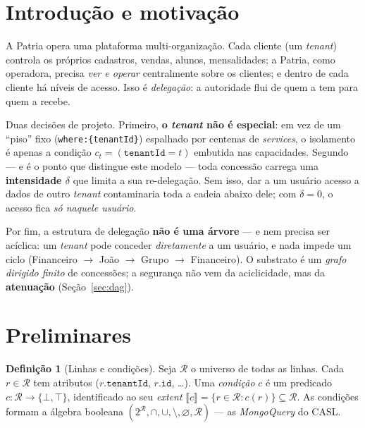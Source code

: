 \documentclass[11pt,a4paper]{article}
\theoremstyle{definition}
\newtheorem{definition}[theorem]{Definição}
\newcommand{\R}{\mathcal{R}}
\newcommand{\ext}[1]{\llbracket #1 \rrbracket}
\newcommand{\tenant}{\texttt{tenantId}}
\newcommand{\dep}{\delta}
\begin{document}
  \tableofcontents
  \bigskip

  \section{Introdução e motivação}

  A Patria opera uma plataforma multi-organização. Cada cliente (um
  \emph{tenant}) controla os próprios cadastros, vendas, alunos, mensalidades;
  a Patria, como operadora, precisa \emph{ver e operar} centralmente sobre os
  clientes; e dentro de cada cliente há níveis de acesso. Isso é
  \emph{delegação}: a autoridade flui de quem a tem para quem a recebe.

  Duas decisões de projeto. Primeiro, \textbf{o \emph{tenant} não é especial}:
  em vez de um ``piso'' fixo (\texttt{where:\{tenantId\}}) espalhado por
  centenas de \emph{services}, o isolamento é apenas a condição
  $c_t=(\tenant=t)$ embutida nas capacidades. Segundo --- e é o ponto que
  distingue este modelo --- toda concessão carrega uma \textbf{intensidade
  $\dep$} que limita a sua re-delegação. Sem isso, dar a um usuário acesso a
  dados de outro \emph{tenant} contaminaria toda a cadeia abaixo dele; com
  $\dep=0$, o acesso fica \emph{só naquele usuário}.

  Por fim, a estrutura de delegação \textbf{não é uma árvore} --- e nem precisa
  ser acíclica: um \emph{tenant} pode conceder \emph{diretamente} a um usuário,
  e nada impede um ciclo (Financeiro $\to$ João $\to$ Grupo $\to$ Financeiro).
  O substrato é um \emph{grafo dirigido finito} de concessões; a segurança não
  vem da aciclicidade, mas da \textbf{atenuação} (Seção~\ref{sec:dag}).

  \section{Preliminares}

  \begin{definition}[Linhas e condições]
  Seja $\R$ o universo de todas as linhas. Cada $r\in\R$ tem atributos
  ($r.\tenant$, $r.\texttt{id}$, \dots). Uma \emph{condição} $c$ é um predicado
  $c:\R\to\{\bot,\top\}$, identificado ao seu \emph{extent}
  $\ext{c}=\{r\in\R:c(r)\}\subseteq\R$. As condições formam a álgebra booleana
  $(2^{\R},\cap,\cup,\setminus,\varnothing,\R)$ --- as \emph{MongoQuery} do CASL.
  \end{definition}
\end{document}
